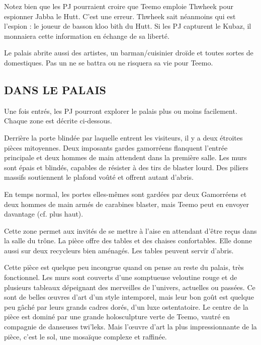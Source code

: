 \documentclass[a4paper,10pt,twoside,twocolumn,openany]{book}
\begin{document}
Notez bien que les PJ pourraient croire que Teemo
emploie Thwheek pour espionner Jabba le Hutt. C’est
une erreur. Thwheek sait néanmoins qui est l’espion : le
joueur de basson kloo bith du Hutt. Si les PJ capturent
le Kubaz, il monnaiera cette information en échange de
sa liberté.

Le palais abrite aussi des artistes, un barman/cuisinier
droïde et toutes sortes de domestiques. Pas un ne se
battra ou ne risquera sa vie pour Teemo.

\subsection{DANS LE PALAIS}
Une fois entrés, les PJ pourront explorer le palais
plus ou moins facilement. Chaque zone est décrite
ci-dessous.

\subtitle{PORTES FORTIFIÉES}

Derrière la porte blindée par laquelle entrent les visiteurs, il y a deux étroites pièces mitoyennes. Deux imposants gardes gamorréens flanquent l’entrée principale et
deux hommes de main attendent dans la première salle.
Les murs sont épais et blindés, capables de résister à
des tirs de blaster lourd. Des piliers massifs soutiennent
le plafond voûté et offrent autant d’abris.

En temps normal, les portes elles-mêmes sont gardées
par deux Gamorréens et deux hommes de main armés
de carabines blaster, mais Teemo peut en envoyer davantage (cf. plus haut).

\subtitle{VESTIBULE}

Cette zone permet aux invités de se mettre à
l’aise en attendant d’être reçus dans la salle du
trône. La pièce offre des tables et des chaises
confortables. Elle donne aussi sur deux recycleurs bien aménagés. Les tables peuvent
servir d’abris.

\subtitle{GRAND CORRIDOR}

Cette pièce est quelque peu incongrue quand on pense au reste du
palais, très fonctionnel. Les murs
sont couverts d’une somptueuse
veloutine rouge et de plusieurs
tableaux dépeignant des merveilles de l’univers, actuelles
ou passées. Ce sont de belles
œuvres d’art d’un style intemporel, mais leur bon
goût est quelque peu
gâché par leurs grands
cadres dorés, d’un luxe
ostentatoire. Le centre
de la pièce est dominé par une grande
holosculpture verte
de Teemo, vautré
en compagnie de
danseuses twi’leks. Mais l’œuvre d’art la plus impressionnante de la pièce, c’est le sol, une mosaïque complexe et raffinée.
\end{document}
